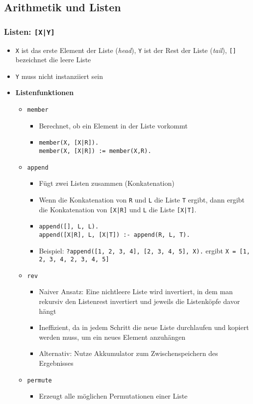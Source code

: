 \subsection{Arithmetik und Listen}

\subsubsection{Listen: \texttt{{[}X{|}Y{]}}}
\begin{itemize}
	\item \texttt{X} ist das erste Element der Liste (\textit{head}), \texttt{Y} ist der Rest der Liste (\textit{tail}), \texttt{{[}{]}} bezeichnet die leere Liste
	\item \texttt{Y} muss nicht instanziiert sein
	\item \textbf{Listenfunktionen}
	\begin{itemize}
		\item \texttt{member}
		\begin{itemize}
			\item Berechnet, ob ein Element in der Liste vorkommt
			\item \texttt{member(X, {[}X{|}R{]}).} \\ \texttt{member(X, {[}X{|}R{]}) := member(X,R).}
		\end{itemize}
		\item \texttt{append}
		\begin{itemize}
			\item Fügt zwei Listen zusammen (Konkatenation)
			\item Wenn die Konkatenation von \texttt{R} und \texttt{L} die Liste \texttt{T} ergibt, dann ergibt die Konkatenation von \texttt{{[}X{|}R{]}} und \texttt{L} die Liste \texttt{{[}X{|}T{]}}.
			\item \texttt{append({[]}, L, L).} \\ \texttt{append({[}X{|}R{]}, L, {[}X{|}T{]}) :- append(R, L, T).}
			\item Beispiel: \texttt{?append({[}1, 2, 3, 4{]}, {[}2, 3, 4, 5{]}, X).} ergibt \texttt{X = {[}1, 2, 3, 4, 2, 3, 4, 5{]}}
		\end{itemize}
		\item \texttt{rev}
		\begin{itemize}
			\item Naiver Ansatz: Eine nichtleere Liste wird invertiert, in dem man rekursiv den Listenrest invertiert und jeweils die Listenköpfe davor hängt
			\item Ineffizient, da in jedem Schritt die neue Liste durchlaufen und kopiert werden muss, um ein neues Element anzuhängen
			\item Alternativ: Nutze Akkumulator zum Zwischenspeichern des Ergebnisses
		\end{itemize}
		\item \texttt{permute}
		\begin{itemize}
			\item Erzeugt alle möglichen Permutationen einer Liste
		\end{itemize}
	\end{itemize}
\end{itemize}

